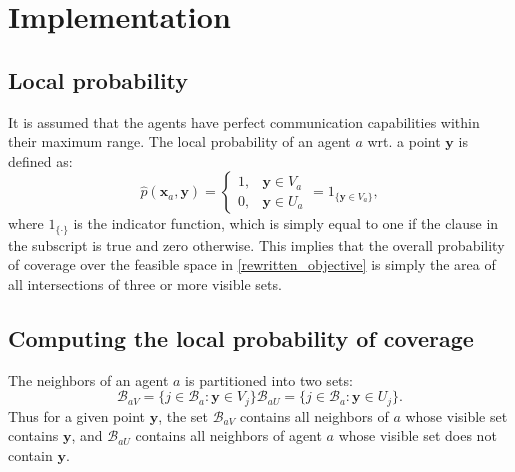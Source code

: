 \section{Implementation}
\subsection{Local probability}
It is assumed that the agents have perfect communication capabilities within their maximum range. The local probability of an agent $a$ wrt. a point $\mathbf{y}$ is defined as:
\begin{equation}
  \hat{p}(\mathbf{x}_{a}, \mathbf{y}) = \begin{cases}
    1, &\mathbf{y}\in V_{a}\\
    0, &\mathbf{y}\in U_{a}
  \end{cases} = 1_{\big\{\mathbf{y}\in V_{a}\big\}},
\end{equation}
where $1_{\{\cdot\}}$ is the indicator function, which is simply equal to one if the clause in the subscript is true and zero otherwise.
This implies that the overall probability of coverage over the feasible space in \eqref{rewritten_objective} is simply the area of all intersections of three or more visible sets.

\subsection{Computing the local probability of coverage}
The neighbors of an agent $a$ is partitioned into two sets:
\begin{subequations}
  \begin{equation}
    \mathcal{B}_{a V} = \{j\in\mathcal{B}_{a}: \mathbf{y}\in V_{j}\}
  \end{equation}
  \begin{equation}
    \mathcal{B}_{a U} = \{j\in\mathcal{B}_{a}: \mathbf{y}\in U_{j}\}.
  \end{equation}
\end{subequations}
Thus for a given point $\mathbf{y}$, the set $\mathcal{B}_{a V}$ contains all neighbors of $a$ whose visible set contains $\mathbf{y}$,
and $\mathcal{B}_{a U}$ contains all neighbors of agent $a$ whose visible set does not contain $\mathbf{y}$.

